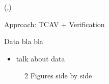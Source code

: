 \documentclass[final]{beamer}
\begin{document}
\begin{frame}[fragile]{}
\begin{textblock}{\colwidth}(\secondcolpos,\vstartCols)
\begin{paddedBlock}{Approach: TCAV + Verification}

\alert{Data bla bla}
  \begin{itemize}
    \item talk about data
  \end{itemize}

\begin{figure}%
    \centering
    \qquad
    \caption{2 Figures side by side}%
    \label{fig:example}%
\end{figure}



\end{paddedBlock}
\end{textblock}
\end{frame}
\end{document}
